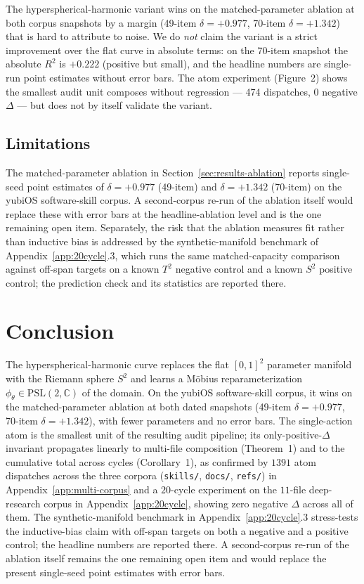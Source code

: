\documentclass[11pt,a4paper]{article}
\theoremstyle{plain}
\theoremstyle{remark}
\theoremstyle{plain}
\begin{document}
The hyperspherical-harmonic variant wins on the matched-parameter ablation at both corpus snapshots by a margin (49-item $\delta = +0.977$, 70-item $\delta = +1.342$) that is hard to attribute to noise. We do \emph{not} claim the variant is a strict improvement over the flat curve in absolute terms: on the 70-item snapshot the absolute $R^2$ is $+0.222$ (positive but small), and the headline numbers are single-run point estimates without error bars. The atom experiment (Figure~2) shows the smallest audit unit composes without regression --- 474 dispatches, 0 negative $\Delta$ --- but does not by itself validate the variant.

\subsection{Limitations}
\label{sec:limitations}

The matched-parameter ablation in Section~\ref{sec:results-ablation} reports single-seed point estimates of $\delta = +0.977$ (49-item) and $\delta = +1.342$ (70-item) on the yubiOS software-skill corpus. A second-corpus re-run of the ablation itself would replace these with error bars at the headline-ablation level and is the one remaining open item. Separately, the risk that the ablation measures fit rather than inductive bias is addressed by the synthetic-manifold benchmark of Appendix~\ref{app:20cycle}.3, which runs the same matched-capacity comparison against off-span targets on a known $T^2$ negative control and a known $S^2$ positive control; the prediction check and its statistics are reported there.


\section{Conclusion}

The hyperspherical-harmonic curve replaces the flat $[0,1]^2$ parameter manifold with the Riemann sphere $S^2$ and learns a M\"obius reparameterization $\phi_\theta \in \mathrm{PSL}(2,\mathbb{C})$ of the domain. On the yubiOS software-skill corpus, it wins on the matched-parameter ablation at both dated snapshots (49-item $\delta = +0.977$, 70-item $\delta = +1.342$), with fewer parameters and no error bars. The single-action atom is the smallest unit of the resulting audit pipeline; its only-positive-$\Delta$ invariant propagates linearly to multi-file composition (Theorem~1) and to the cumulative total across cycles (Corollary~1), as confirmed by $1391$ atom dispatches across the three corpora (\texttt{skills/}, \texttt{docs/}, \texttt{refs/}) in Appendix~\ref{app:multi-corpus} and a $20$-cycle experiment on the $11$-file deep-research corpus in Appendix~\ref{app:20cycle}, showing zero negative $\Delta$ across all of them. The synthetic-manifold benchmark in Appendix~\ref{app:20cycle}.3 stress-tests the inductive-bias claim with off-span targets on both a negative and a positive control; the headline numbers are reported there. A second-corpus re-run of the ablation itself remains the one remaining open item and would replace the present single-seed point estimates with error bars.
\end{document}

